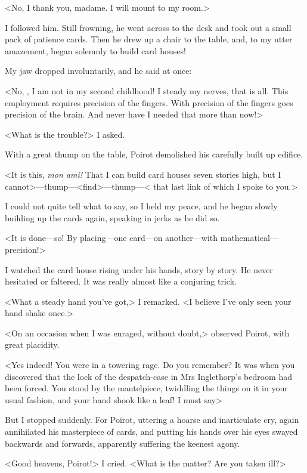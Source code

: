  <No, I thank you, madame. I will mount to my room.> 

 I followed him. Still frowning, he went across to the desk and took out a small pack of patience cards. Then he drew up a chair to the table, and, to my utter amazement, began solemnly to build card houses! 

 My jaw dropped involuntarily, and he said at once: 

 <No, , I am not in my second childhood! I steady my nerves, that is all. This employment requires precision of the fingers. With precision of the fingers goes precision of the brain. And never have I needed that more than now!> 

 <What is the trouble?> I asked. 

 With a great thump on the table, Poirot demolished his carefully built up edifice. 

 <It is this, \textit{mon ami!} That I can build card houses seven stories high, but I cannot>—thump—<find>—thump—< that last link of which I spoke to you.> 

 I could not quite tell what to say, so I held my peace, and he began slowly building up the cards again, speaking in jerks as he did so. 

 <It is done—so! By placing—one card—on another—with mathematical—precision!> 

 I watched the card house rising under his hands, story by story. He never hesitated or faltered. It was really almost like a conjuring trick. 

 <What a steady hand you've got,> I remarked. <I believe I've only seen your hand shake once.> 

 <On an occasion when I was enraged, without doubt,> observed Poirot, with great placidity. 

 <Yes indeed! You were in a towering rage. Do you remember? It was when you discovered that the lock of the despatch-case in Mrs Inglethorp's bedroom had been forced. You stood by the mantelpiece, twiddling the things on it in your usual fashion, and your hand shook like a leaf! I must say\longdash> 

 But I stopped suddenly. For Poirot, uttering a hoarse and inarticulate cry, again annihilated his masterpiece of cards, and putting his hands over his eyes swayed backwards and forwards, apparently suffering the keenest agony. 

 <Good heavens, Poirot!> I cried. <What is the matter? Are you taken ill?> 

